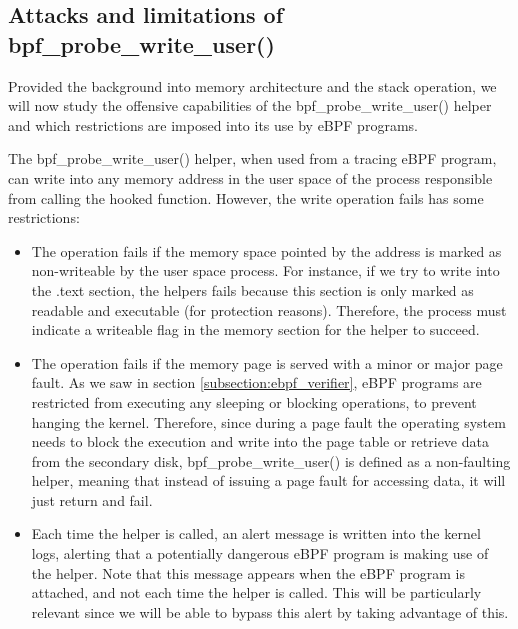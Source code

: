 \documentclass[12pt]{report} %
\begin{document}
\subsection{Attacks and limitations of bpf\_probe\_write\_user()} \label{subsection:bpf_probe_write_apps}
Provided the background into memory architecture and the stack operation, we will now study the offensive capabilities of the bpf\_probe\_write\_user() helper and which restrictions are imposed into its use by eBPF programs.

The bpf\_probe\_write\_user() helper, when used from a tracing eBPF program, can write into any memory address in the user space of the process responsible from calling the hooked function. However, the write operation fails has some restrictions:
\begin{itemize}
\item{The operation fails if the memory space pointed by the address is marked as non-writeable by the user space process. For instance, if we try to write into the .text section, the helpers fails because this section is only marked as readable and executable (for protection reasons).} Therefore, the process must indicate a writeable flag in the memory section for the helper to succeed.
\item{The operation fails if the memory page is served with a minor or major page fault. As we saw in section \ref{subsection:ebpf_verifier}, eBPF programs are restricted from executing any sleeping or blocking operations, to prevent hanging the kernel. Therefore, since during a page fault the operating system needs to block the execution and write into the page table or retrieve data from the secondary disk, bpf\_probe\_write\_user() is defined as a non-faulting helper\cite{write_helper_non_fault}, meaning that instead of issuing a page fault for accessing data, it will just return and fail.}
\item{Each time the helper is called, an alert message is written into the kernel logs, alerting that a potentially dangerous eBPF program is making use of the helper. Note that this message appears when the eBPF program is attached, and not each time the helper is called. This will be particularly relevant since we will be able to bypass this alert by taking advantage of this.}
\end{itemize}
\end{document}
